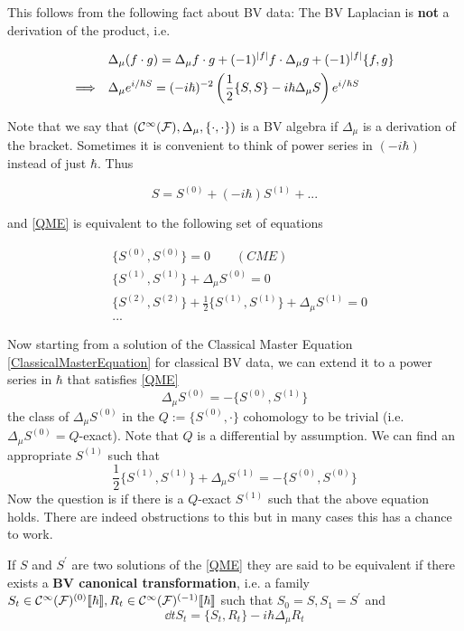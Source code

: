 This follows from the following fact about BV data: The BV Laplacian is \textbf{not} a derivation of the product, i.e.

\begin{align}
  &\Delta_\mu (f \cdot g) = \Delta_\mu f \cdot g + (-1)^{|f|} f \cdot \Delta_\mu g + (-1)^{|f|} \{f,g\} \\
  \Longrightarrow \quad &\Delta_\mu e^{i/\hbar S} = (-i \hbar)^{-2} \left( \frac{1}{2} \{S,S\} - i \hbar \Delta_\mu S \right) e^{i/\hbar S}
\end{align}

Note that we say that $(\mathcal{C}^{\infty}({\mathcal{F}}), \Delta_\mu, \{\cdot, \cdot\})$ is a BV algebra if $\Delta_\mu$ is a derivation of the bracket. Sometimes it is convenient to think of power series in $(-i \hbar)$ instead of just $\hbar$. Thus

\begin{equation}
  S = S^{(0)} + (-i \hbar) S^{(1)} + ...
\end{equation}

and \eqref{QME} is equivalent to the following set of equations

\begin{align*}
  &\{S^{(0)}, S^{(0)}\} = 0 \quad \quad (CME)\\
  &\{S^{(1)}, S^{(1)}\} + \Delta_\mu S^{(0)} = 0 \\
  &\{S^{(2)}, S^{(2)}\} + \frac{1}{2} \{S^{(1)}, S^{(1)}\} + \Delta_\mu S^{(1)} = 0 \\
  &...
\end{align*}

Now starting from a solution of the Classical Master Equation \eqref{ClassicalMasterEquation} for classical BV data, we can extend it to a power series in $\hbar$ that satisfies \eqref{QME}
\begin{equation}
  \Delta_\mu S^{(0)} = - \{S^{(0)},S^{(1)}\}
\end{equation}
the class of $\Delta_\mu S^{(0)}$ in the $Q := \{S^{(0)}, \cdot\}$ cohomology to be trivial (i.e. $\Delta_\mu S^{(0)} = Q$-exact). Note that $Q$ is a differential by assumption. We can find an appropriate $S^{(1)}$ such that
\begin{equation}
  \frac{1}{2} \{S^{(1)}, S^{(1)}\} + \Delta_\mu S^{(1)} = - \{S^{(0)}, S^{(0)}\}
\end{equation}
Now the question is if there is a $Q$-exact $S^{(1)}$ such that the above equation holds. There are indeed obstructions to this but in many cases this has a chance to work.

\begin{definition}
  If $S$ and $S^\prime$ are two solutions of the \eqref{QME} they are said to be equivalent if there exists a \textbf{BV canonical transformation}, i.e. a family $S_t \in \mathcal{C}^{\infty}({\mathcal{F}})^{(0)}\llbracket \hbar \rrbracket, R_t \in \mathcal{C}^{\infty}({\mathcal{F}})^{(-1)}\llbracket \hbar \rrbracket$ such that $S_0 = S, S_1 = S^\prime$ and
  \begin{equation}\tag{$\blacksquare$}\label{BVCanonical}
    \dd{}{t} S_t = \{S_t, R_t\} - i \hbar \Delta_\mu R_t
  \end{equation}
\end{definition}

